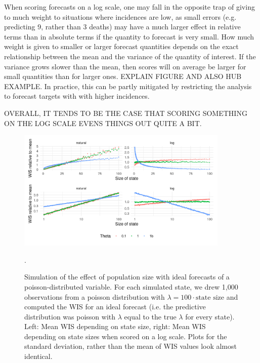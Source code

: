 \documentclass{article}
\begin{document}
When scoring forecasts on a log scale, one may fall in the opposite trap of giving to much weight to situations where incidences are low, as small errors (e.g. predicting 9, rather than 3 deaths) may have a much larger effect in relative terms than in absolute terms if the quantity to forecast is very small. How much weight is given to smaller or larger forecast quantities depends on the exact relationship between the mean and the variance of the quantity of interest. If the variance grows slower than the mean, then scores will on average be larger for small quantities than for larger ones. 
EXPLAIN FIGURE AND ALSO HUB EXAMPLE. 
In practice, this can be partly mitigated by restricting the analysis to forecast targets with with higher incidences. 

OVERALL, IT TENDS TO BE THE CASE THAT SCORING SOMETHING ON THE LOG SCALE EVENS THINGS OUT QUITE A BIT.




\begin{figure}[h!]
    \centering
    \includegraphics[width=0.9\textwidth]{output/figures/SIM-mean-sd-state-size.png}
    \caption{Simulation of the effect of population size with ideal forecasts of a poisson-distributed variable. For each simulated state, we drew 1,000 observations from a poisson distribution with $\lambda = 100 \cdot \text{state size}$ and computed the WIS for an ideal forecast (i.e. the predictive distribution was poisson with $\lambda$ equal to the true $\lambda$ for every state). Left: Mean WIS depending on state size, right: Mean WIS depending on state sizes when scored on a log scale. Plots for the standard deviation, rather than the mean of WIS values look almost identical.}. 
    \label{fig:log-crps-viz}
\end{figure}
\end{document}
